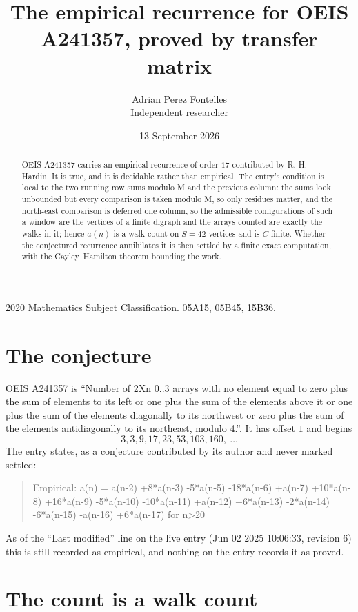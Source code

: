 \documentclass[11pt,a4paper]{article}
\title{The empirical recurrence for OEIS A241357, proved by transfer matrix}
\author{Adrian Perez Fontelles\\ \small Independent researcher}
\date{13 September 2026}
\theoremstyle{plain}
\theoremstyle{definition}
\begin{document}
\maketitle

\begin{abstract}
OEIS A241357 carries an empirical recurrence of order $17$ contributed by R. H. Hardin. It is
true, and it is decidable rather than empirical. The entry's condition is local to the two running row sums modulo M and the previous column: the sums look unbounded but every comparison is taken modulo M, so only residues matter, and the north-east comparison is deferred one column, so
the admissible configurations of such a window are the vertices of a finite digraph and the
arrays counted are exactly the walks in it; hence $a(n)$ is a walk count on $S=42$ vertices
and is $C$-finite. Whether the conjectured recurrence annihilates it is then settled by a
finite exact computation, with the Cayley--Hamilton theorem bounding the work.
\end{abstract}

\noindent\small 2020 Mathematics Subject Classification. 05A15, 05B45, 15B36.\normalsize

\section{The conjecture}

OEIS A241357 is ``Number of 2Xn 0..3 arrays with no element equal to zero plus the sum of elements to its left or one plus the sum of the elements above it or one plus the sum of the elements diagonally to its northwest or zero plus the sum of the elements antidiagonally to its northeast, modulo 4.''. It has offset $1$ and begins
\[
3, 3, 9, 17, 23, 53, 103, 160,\ \dots
\]
The entry states, as a conjecture contributed by its author and never marked settled:
\begin{quote}
Empirical: a(n) = a(n-2) +8*a(n-3) -5*a(n-5) -18*a(n-6) +a(n-7) +10*a(n-8) +16*a(n-9) -5*a(n-10) -10*a(n-11) +a(n-12) +6*a(n-13) -2*a(n-14) -6*a(n-15) -a(n-16) +6*a(n-17) for n>20
\end{quote}
As of the ``Last modified'' line on the live entry (Jun 02 2025 10:06:33, revision 6) this is still
recorded as empirical, and nothing on the entry records it as proved.

\section{The count is a walk count}
\end{document}
